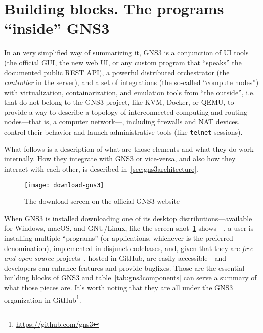 \section{Building blocks. The programs ``inside'' GNS3}
\label{sec:gns3buildingblocks}

In an very simplified way of summarizing it, GNS3 is a conjunction of UI tools (the official GUI, the new web UI, or any custom program that ``speaks'' the documented public \acrshort{REST} API), a powerful distributed orchestrator (the \emph{controller} in the server), and a set of integrations (the so-called ``compute nodes'') with virtualization, containarization, and emulation tools from ``the outside'', i.e. that do not belong to the GNS3 project, like KVM, Docker, or QEMU, to provide a way to describe a topology of interconnected computing and routing nodes---that is, a computer network---, including firewalls and NAT devices, control their behavior and launch administrative tools (like \texttt{telnet} sessions). %

What follows is a description of what are those elements and what they do work internally.
How they integrate with GNS3 or vice-versa, and also how they interact with each other, is described in~\ref{sec:gns3architecture}.

\begin{figure}
  \centering
  \texttt{[image: download-gns3]}
  \caption{The download screen on the official GNS3 website}
  \label{fig:download-gns3}
\end{figure}

When GNS3 is installed downloading one of its desktop distributions---available for Windows, macOS, and GNU/Linux, like the screen shot~\ref{fig:download-gns3} shows---, a user is installing multiple ``programs'' (or applications, whichever is the preferred denomination), implemented in disjunct codebases, and, given that they are \emph{free and open source} projects~\cite{gplv3}, hosted in GitHub, are easily accessible---and developers can enhance features and provide bugfixes.
Those are the essential building blocks of GNS3 and table~\ref{tab:gns3components} can serve a summary of what those pieces are.
It's worth noting that they are all under the GNS3 organization in GitHub\footnote{\url{https://github.com/gns3}}.



